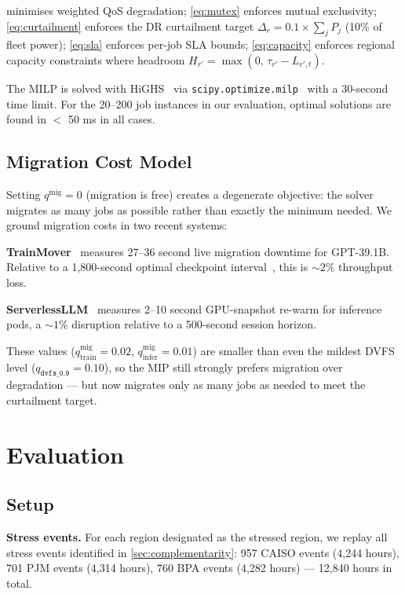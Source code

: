 \documentclass[sigplan,10pt,review]{acmart}
\begin{document}
 minimises weighted QoS degradation; \cref{eq:mutex} enforces
mutual exclusivity; \cref{eq:curtailment} enforces the DR curtailment target
$\Delta_r = 0.1 \times \sum_j P_j$ (10\% of fleet power); \cref{eq:sla}
enforces per-job SLA bounds; \cref{eq:capacity} enforces regional capacity
constraints where headroom $H_{r'} = \max(0,\, \tau_{r'} - L_{r',t})$.

The MILP is solved with HiGHS~\cite{highs2023} via \texttt{scipy.optimize.milp}~\cite{scipy2020} with a 30-second time limit.
For the 20--200 job instances in our evaluation, optimal solutions are found
in $<$ 50 ms in all cases.

\subsection{Migration Cost Model}

Setting $q^{\text{mig}} = 0$ (migration is free) creates a degenerate
objective: the solver migrates as many jobs as possible rather than exactly
the minimum needed.  We ground migration costs in two recent systems:

\textbf{TrainMover}~\cite{trainmover2024} measures 27--36 second live
migration downtime for GPT-39.1B.  Relative to a 1,800-second optimal
checkpoint interval~\cite{jitcheckpoint}, this is ${\sim}2\%$ throughput loss.

\textbf{ServerlessLLM}~\cite{serverlessllm2024} measures 2--10 second
GPU-snapshot re-warm for inference pods, a ${\sim}1\%$ disruption relative to
a 500-second session horizon.

These values ($q^{\text{mig}}_{\text{train}}=0.02$,
$q^{\text{mig}}_{\text{infer}}=0.01$) are smaller than even the mildest
DVFS level ($q_{\texttt{dvfs\_0.9}}=0.10$), so the MIP still strongly
prefers migration over degradation — but now migrates only as many jobs as
needed to meet the curtailment target.


\section{Evaluation}
\label{sec:eval}

\subsection{Setup}

\textbf{Stress events.} For each region designated as the stressed region,
we replay all stress events identified in \cref{sec:complementarity}:
957 CAISO events (4,244 hours), 701 PJM events (4,314 hours), 760 BPA events
(4,282 hours) — 12,840 hours in total.
\end{document}
